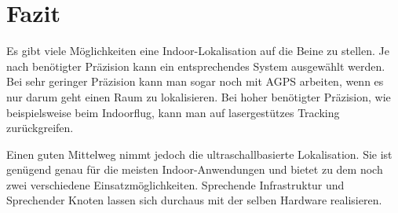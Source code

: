 \chapter{Fazit}
Es gibt viele Möglichkeiten eine Indoor-Lokalisation auf die Beine zu
stellen. Je nach benötigter Präzision kann ein entsprechendes System
ausgewählt werden. Bei sehr geringer Präzision kann man sogar noch mit AGPS
arbeiten, wenn es nur darum geht einen Raum zu lokalisieren. Bei hoher
benötigter Präzision, wie beispielsweise beim Indoorflug, kann man auf
lasergestützes Tracking zurückgreifen.

Einen guten Mittelweg nimmt jedoch die ultraschallbasierte Lokalisation.
Sie ist genügend genau für die meisten Indoor-Anwendungen und bietet zu dem
noch zwei verschiedene Einsatzmöglichkeiten.
\dq Sprechende Infrastruktur\dq{} und \dq Sprechender Knoten\dq{} lassen
sich durchaus mit der selben Hardware realisieren.

\cleardoublepage
